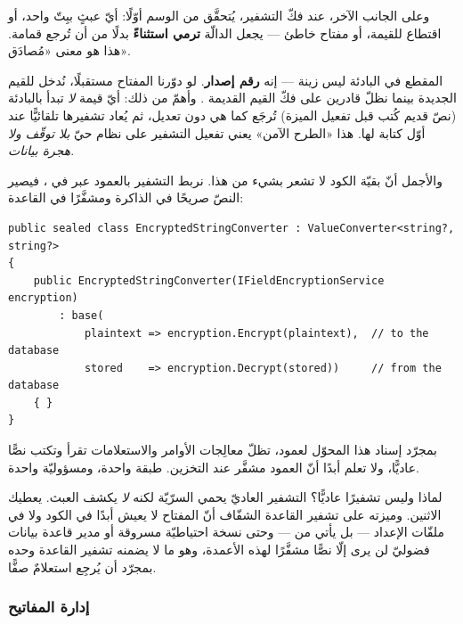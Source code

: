 وعلى الجانب الآخر، عند فكّ التشفير، يُتحقَّق من الوسم  أوّلًا: أيّ عبثٍ
ببِتّ واحد، أو اقتطاع للقيمة، أو مفتاح خاطئ — يجعل الدالّة 
\textbf{ترمي استثناءً} بدلًا من أن تُرجع قمامة. هذا هو معنى «مُصادَق».

\begin{keyp}
المقطع  في البادئة ليس زينة — إنه \textbf{رقم إصدار}. لو دوّرنا المفتاح
مستقبلًا، نُدخل  للقيم الجديدة بينما نظلّ قادرين على فكّ القيم القديمة
. وأهمّ من ذلك: أيّ قيمة \emph{لا} تبدأ بالبادئة (نصّ قديم كُتب قبل تفعيل
الميزة) تُرجَع كما هي دون تعديل، ثم يُعاد تشفيرها تلقائيًّا عند أوّل كتابة لها. هذا
«الطرح الآمن» يعني تفعيل التشفير على نظام حيّ \emph{بلا توقّف ولا هجرة بيانات}.
\end{keyp}

والأجمل أنّ بقيّة الكود لا تشعر بشيء من هذا. نربط التشفير بالعمود عبر  في ، فيصير النصّ صريحًا في الذاكرة ومشفَّرًا في القاعدة:

\begin{english}
\begin{lstlisting}[language={[Sharp]C}]
public sealed class EncryptedStringConverter : ValueConverter<string?, string?>
{
    public EncryptedStringConverter(IFieldEncryptionService encryption)
        : base(
            plaintext => encryption.Encrypt(plaintext),  // to the database
            stored    => encryption.Decrypt(stored))     // from the database
    { }
}
\end{lstlisting}
\end{english}

بمجرّد إسناد هذا المحوّل لعمود، تظلّ معالِجات الأوامر والاستعلامات تقرأ وتكتب نصًّا
عاديًّا، ولا تعلم أبدًا أنّ العمود مشفَّر عند التخزين. طبقة واحدة، ومسؤوليّة واحدة.

\begin{secnote}
لماذا  وليس تشفيرًا عاديًّا؟ التشفير العاديّ يحمي السرّيّة لكنه \emph{لا}
يكشف العبث.  يعطيك الاثنين. وميزته على تشفير القاعدة الشفّاف  أنّ
المفتاح لا يعيش أبدًا في الكود ولا في ملفّات الإعداد — بل يأتي من  —
وحتى نسخة احتياطيّة مسروقة أو مدير قاعدة بيانات فضوليّ لن يرى إلّا نصًّا مشفَّرًا
لهذه الأعمدة، وهو ما لا يضمنه تشفير القاعدة وحده بمجرّد أن يُرجِع استعلامٌ صفًّا.
\end{secnote}

\subsubsection{إدارة المفاتيح}

